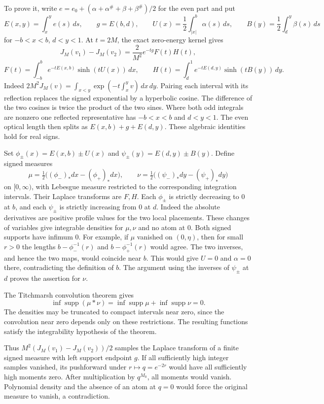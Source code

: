 \documentclass[11pt,letterpaper]{article}
\begin{document}
To prove it, write $e=e_0+(\alpha+\alpha^\#+\beta+\beta^\#)/2$ for the even part and put
\[
 E(x,y)=\int_x^y e(s)\,ds,\qquad
 g=E(b,d),\qquad U(x)=\frac12\int_{|x|}^{b}\alpha(s)\,ds,\qquad
 B(y)=\frac12\int_d^y\beta(s)\,ds
\]
for $-b<x<b$, $d<y<1$. At $t=2M$, the exact zero-energy kernel gives
\[
 J_M(v_1)-J_M(v_2)=\frac{2}{M^2} e^{-tg} F(t) H(t),
\]
\[
 F(t)=\int_{-b}^{b} e^{-tE(x,b)}\sinh(tU(x))\,dx,\qquad
 H(t)=\int_d^1 e^{-tE(d,y)}\sinh(tB(y))\,dy .
\]
Indeed $2M^2J_M(v)=\int_{x<y}\exp(-t\int_x^y v)\,dx\,dy$. Pairing each interval with its reflection replaces the signed exponential by a hyperbolic cosine. The difference of the two cosines is twice the product of the two sines. Where both odd integrals are nonzero one reflected representative has $-b<x<b$ and $d<y<1$. The even optical length then splits as $E(x,b)+g+E(d,y)$. These algebraic identities hold for real signs.

Set $\phi_\pm(x)=E(x,b)\pm U(x)$ and $\psi_\pm(y)=E(d,y)\pm B(y)$. Define signed measures
\[
 \mu=\tfrac12\big((\phi_-)_*dx-(\phi_+)_*dx\big),\qquad
 \nu=\tfrac12\big((\psi_-)_*dy-(\psi_+)_*dy\big)
\]
on $[0,\infty)$, with Lebesgue measure restricted to the corresponding integration intervals. Their Laplace transforms are $F,H$. Each $\phi_\pm$ is strictly decreasing to $0$ at $b$, and each $\psi_\pm$ is strictly increasing from $0$ at $d$. Indeed the absolute derivatives are positive profile values for the two local placements. These changes of variables give integrable densities for $\mu,\nu$ and no atom at $0$. Both signed supports have infimum $0$. For example, if $\mu$ vanished on $(0,\eta)$, then for small $r>0$ the lengths $b-\phi_-^{-1}(r)$ and $b-\phi_+^{-1}(r)$ would agree. The two inverses, and hence the two maps, would coincide near $b$. This would give $U=0$ and $\alpha=0$ there, contradicting the definition of $b$. The argument using the inverses of $\psi_\pm$ at $d$ proves the assertion for $\nu$.

The Titchmarsh convolution theorem \cite{titchmarsh} gives
\[
 \inf\operatorname{supp}(\mu*\nu)
 =\inf\operatorname{supp}\mu+\inf\operatorname{supp}\nu=0 .
\]
The densities may be truncated to compact intervals near zero, since the convolution near zero depends only on these restrictions. The resulting functions satisfy the integrability hypothesis of the theorem.

Thus $M^2(J_M(v_1)-J_M(v_2))/2$ samples the Laplace transform of a finite signed measure with left support endpoint $g$. If all sufficiently high integer samples vanished, its pushforward under $r\mapsto q=e^{-2r}$ would have all sufficiently high moments zero. After multiplication by $q^{M_0}$, all moments would vanish. Polynomial density and the absence of an atom at $q=0$ would force the original measure to vanish, a contradiction.
\end{document}
